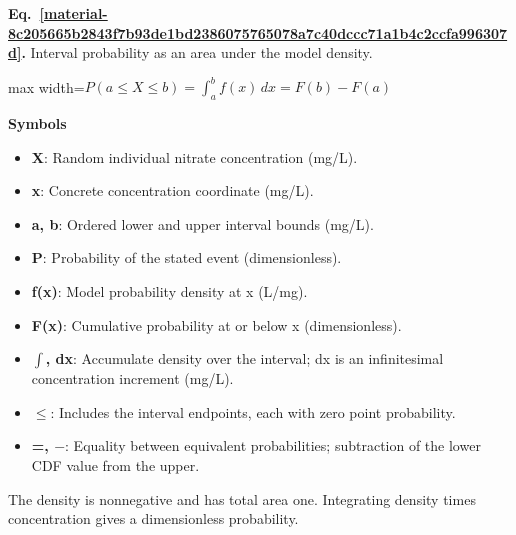 \documentclass[11pt,a4paper]{article}
\begin{document}
\par\medskip
\begin{samepage}
\label{material-8c205665b2843f7b93de1bd2386075765078a7c40dccc71a1b4c2ccfa996307d}
\noindent\textbf{Eq.~\ref*{material-8c205665b2843f7b93de1bd2386075765078a7c40dccc71a1b4c2ccfa996307d}.} Interval probability as an area under the model density.\par\nopagebreak
\begin{center}\begin{adjustbox}{max width=\linewidth}$\displaystyle P(a\le X\le b)=\int_a^b f(x)\,dx=F(b)-F(a)$\end{adjustbox}\end{center}

\par\noindent\textbf{Symbols}

\begin{itemize}\setlength{\itemsep}{1pt}\setlength{\parsep}{0pt}
\item \textbf{X}: Random individual nitrate concentration (mg/L).
\item \textbf{x}: Concrete concentration coordinate (mg/L).
\item \textbf{a, b}: Ordered lower and upper interval bounds (mg/L).
\item \textbf{P}: Probability of the stated event (dimensionless).
\item \textbf{f(x)}: Model probability density at x (L/mg).
\item \textbf{F(x)}: Cumulative probability at or below x (dimensionless).
\item \textbf{\ensuremath{\int}, dx}: Accumulate density over the interval; dx is an infinitesimal concentration increment (mg/L).
\item \textbf{\ensuremath{\le}}: Includes the interval endpoints, each with zero point probability.
\item \textbf{=, \ensuremath{-}}: Equality between equivalent probabilities; subtraction of the lower CDF value from the upper.
\end{itemize}

The density is nonnegative and has total area one. Integrating density times concentration gives a dimensionless probability.

\end{samepage}
\medskip
\end{document}
